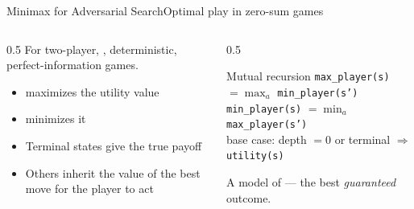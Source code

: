 \documentclass[aspectratio=169,11pt]{beamer}
\begin{document}
\begin{frame}{Minimax for Adversarial Search}{Optimal play in zero-sum games}
  \begin{columns}[T]
    \begin{column}{0.5\textwidth}
      For two-player, , deterministic, perfect-information games.
      \begin{itemize}\small
        \item {} maximizes the utility value
        \item {} minimizes it
        \item Terminal states give the true payoff
        \item Others inherit the value of the best move for the player to act
      \end{itemize}
    \end{column}
    \begin{column}{0.5\textwidth}
      \begin{block}{Mutual recursion}
        \scriptsize
        \texttt{max\_player(s)} $=\displaystyle\max_{a}$ \texttt{min\_player(s')}\\[0.2em]
        \texttt{min\_player(s)} $=\displaystyle\min_{a}$ \texttt{max\_player(s')}\\[0.2em]
        base case: depth $=0$ or terminal $\Rightarrow$ \texttt{utility(s)}
      \end{block}
      \centering\scriptsize A model of  — the best
      \emph{guaranteed} outcome.
    \end{column}
  \end{columns}
\end{frame}
\end{document}
